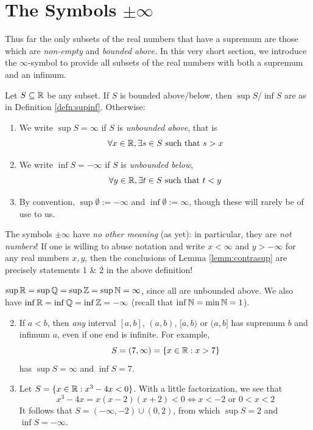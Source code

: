 \section[The Symbols +/- Infinity]{The Symbols $\pm\infty$}

Thus far the only subsets of the real numbers that have a supremum are those which are \emph{non-empty} and \emph{bounded above.} In this very short section, we introduce the $\infty$-symbol to provide all subsets of the real numbers with both a supremum and an infimum.

\begin{defn}{}{}
	Let $S\subseteq\mathbb{R}$ be any subset. If $S$ is bounded above/below, then $\sup S$/$\inf S$ are as in Definition \ref{defn:supinf}. Otherwise:
	\begin{enumerate}
	  \item We write $\sup S=\infty$ if $S$ is \emph{unbounded above}, that is
	  \[\forall x\in \mathbb{R}, \exists s\in S\text{ such that }s>x\]
	  \item We write $\inf S=-\infty$ if $S$ is \emph{unbounded below},
	  \[\forall y\in \mathbb{R}, \exists t\in S\text{ such that }t<y\]
	  \item By convention, $\sup\emptyset:=-\infty$ and $\inf\emptyset:=\infty$, though these will rarely be of use to us.
	\end{enumerate}
\end{defn}

The symbols $\pm\infty$ have \emph{no other meaning} (as yet): in particular, they are \emph{not numbers}! If one is willing to abuse notation and write $x<\infty$ and $y>-\infty$ for any real numbers $x,y$, then the conclusions of Lemma \ref{lemm:contrasup} are precisely statements 1 \& 2 in the above definition!

\begin{examples}{}{}
	\exstart $\sup\mathbb{R}=\sup\mathbb{Q}=\sup\mathbb{Z}=\sup\mathbb{N}=\infty$, since all are unbounded above. We also have $\inf\mathbb{R}=\inf\mathbb{Q}=\inf\mathbb{Z}=-\infty$ (recall that $\inf\mathbb{N}=\min\mathbb{N}=1$).
	\begin{enumerate}\setcounter{enumi}{1}
	  \item If $a<b$, then \emph{any} interval $[a,b]$, $(a,b)$, $[a,b)$ or $(a,b]$ has supremum $b$ and infimum $a$, even if one end is infinite. For example,
		\[S=(7,\infty)=\{x\in\mathbb{R}:x>7\}\]
		has $\sup S=\infty$ and $\inf S=7$.
		\item Let $S=\{x\in\mathbb{R}:x^3-4x<0\}$. With a little factorization, we see that
		\[x^3-4x=x(x-2)(x+2)<0\iff x<-2\text{ or }0<x<2\]
		It follows that $S=(-\infty,-2)\cup(0,2)$, from which $\sup S=2$ and $\inf S=-\infty$.  
	\end{enumerate}
\end{examples}


